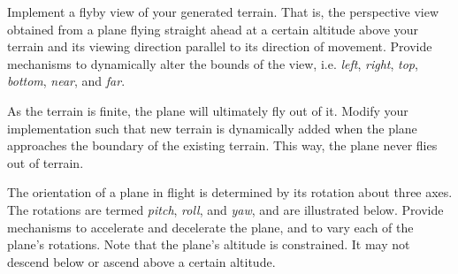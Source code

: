 \documentclass[addpoints]{exam}
\begin{document}
\begin{questions}

  Implement a flyby view of your generated terrain. That is, the perspective view obtained from a plane flying straight ahead at a certain altitude above your terrain and its viewing direction parallel to its direction of movement. Provide mechanisms to dynamically alter the bounds of the view, i.e. \textit{left}, \textit{right}, \textit{top}, \textit{bottom}, \textit{near}, and \textit{far}.


  As the terrain is finite, the plane will ultimately fly out of it. Modify your implementation such that new terrain is dynamically added when the plane approaches the boundary of the existing terrain. This way, the plane never flies out of terrain.


  The orientation of a plane in flight is determined by its rotation about three axes. The rotations are termed \textit{pitch}, \textit{roll}, and \textit{yaw}, and are illustrated below. Provide mechanisms to accelerate and decelerate the plane, and to vary each of the plane's rotations. Note that the plane's altitude is constrained. It may not descend below or ascend above a certain altitude.



\end{questions}
\end{document}
